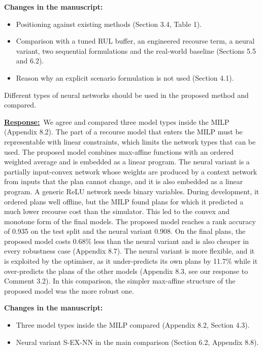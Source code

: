 \documentclass{article}
\newcommand{\response}{\vspace{0.1cm}\noindent\underline{\textbf{Response:}}\ }
\newcommand{\changes}{\vspace{0.1cm}\noindent\textbf{Changes in the manuscript:}}
\begin{document}
\changes
\begin{itemize}[nosep]
\item Positioning against existing methods (Section 3.4, Table 1).
\item Comparison with a tuned RUL buffer, an engineered recourse term, a neural variant, two sequential formulations and the real-world baseline (Sections 5.5 and 6.2).
\item Reason why an explicit scenario formulation is not used (Section 4.1).
\end{itemize}

\begin{cmt}{}{}
Different types of neural networks should be used in the proposed method and compared.
\end{cmt}

\response We agree and compared three model types inside the MILP (Appendix 8.2). The part of a recourse model that enters the MILP must be representable with linear constraints, which limits the network types that can be used. The proposed model combines max-affine functions with an ordered weighted average and is embedded as a linear program. The neural variant is a partially input-convex network whose weights are produced by a context network from inputs that the plan cannot change, and it is also embedded as a linear program. A generic ReLU network needs binary variables. During development, it ordered plans well offline, but the MILP found plans for which it predicted a much lower recourse cost than the simulator. This led to the convex and monotone form of the final models. The proposed model reaches a rank accuracy of 0.935 on the test split and the neural variant 0.908. On the final plans, the proposed model costs 0.68\% less than the neural variant and is also cheaper in every robustness case (Appendix 8.7). The neural variant is more flexible, and it is exploited by the optimiser, as it under-predicts its own plans by 11.7\% while it over-predicts the plans of the other models (Appendix 8.3, see our response to Comment 3.2). In this comparison, the simpler max-affine structure of the proposed model was the more robust one.

\changes
\begin{itemize}[nosep]
\item Three model types inside the MILP compared (Appendix 8.2, Section 4.3).
\item Neural variant S-EX-NN in the main comparison (Section 6.2, Appendix 8.8).
\end{itemize}
\end{document}
